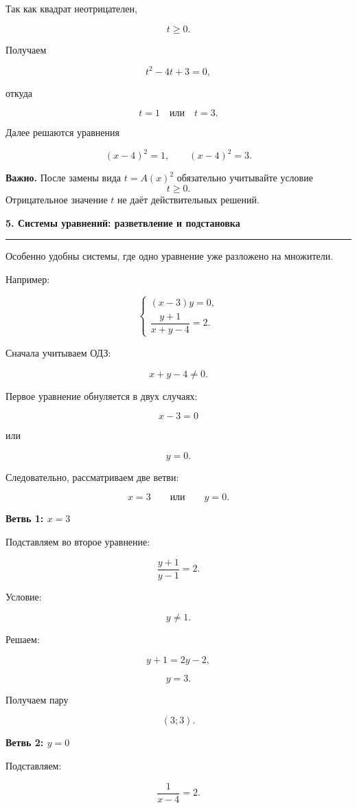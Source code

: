\documentclass[a4paper,12pt]{article}
\newcommand{\topic}[1]{%
    \vspace{0.5em}
    {\Large\bfseries\textcolor{darkaccent}{#1}}\par
    \vspace{0.2em}
    {\color{accent}\rule{\linewidth}{0.7pt}}
    \vspace{0.5em}
}
\newcommand{\subtopic}[1]{%
    \vspace{0.5em}
    {\large\bfseries\textcolor{darkaccent}{#1}}\par
}
\newcommand{\warning}[1]{%
    \par\smallskip
    \textbf{\textcolor{accent}{Важно.}} #1
    \par\smallskip
}
\begin{document}
Так как квадрат неотрицателен,

\[
t\ge0.
\]

Получаем

\[
t^2-4t+3=0,
\]

откуда

\[
t=1
\quad\text{или}\quad
t=3.
\]

Далее решаются уравнения

\[
(x-4)^2=1,
\qquad
(x-4)^2=3.
\]

\warning{
После замены вида \(t=A(x)^2\) обязательно учитывайте условие
\[
t\ge0.
\]
Отрицательное значение \(t\) не даёт действительных решений.
}


\topic{5. Системы уравнений: разветвление и подстановка}

Особенно удобны системы, где одно уравнение уже разложено на множители.

Например:

\[
\begin{cases}
(x-3)y=0,\\[0.3em]
\dfrac{y+1}{x+y-4}=2.
\end{cases}
\]

Сначала учитываем ОДЗ:

\[
x+y-4\ne0.
\]

Первое уравнение обнуляется в двух случаях:

\[
x-3=0
\]

или

\[
y=0.
\]

Следовательно, рассматриваем две ветви:

\[
x=3
\qquad\text{или}\qquad
y=0.
\]

\subtopic{Ветвь 1: \(x=3\)}

Подставляем во второе уравнение:

\[
\frac{y+1}{y-1}=2.
\]

Условие:

\[
y\ne1.
\]

Решаем:

\[
y+1=2y-2,
\]

\[
y=3.
\]

Получаем пару

\[
(3;3).
\]

\subtopic{Ветвь 2: \(y=0\)}

Подставляем:

\[
\frac{1}{x-4}=2.
\]
\end{document}
